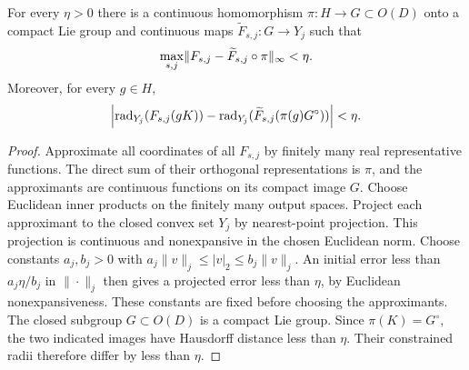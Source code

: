 \begin{lemma}\label{lem:Lieapprox55}
For every $\eta>0$ there is a continuous homomorphism $\pi:H\to G\subset O(D)$ onto a compact Lie group and continuous maps $\widetilde F_{s,j}:G\to Y_j$ such that
\[
           \max_{s,j}\lVert F_{s,j}-\widetilde F_{s,j}\circ\pi\rVert_\infty<\eta.
\]
Moreover, for every $g\in H$,
\[
 \left|\operatorname{rad}_{Y_j}(F_{s,j}(gK))-
 \operatorname{rad}_{Y_j}(\widetilde F_{s,j}(\pi(g)G^\circ))\right|<\eta.
\]
\end{lemma}
\begin{proof}
Approximate all coordinates of all $F_{s,j}$ by finitely many real representative functions. The direct sum of their orthogonal representations is $\pi$, and the approximants are continuous functions on its compact image $G$. Choose Euclidean inner products on the finitely many output spaces. Project each approximant to the closed convex set $Y_j$ by nearest-point projection. This projection is continuous and nonexpansive in the chosen Euclidean norm. Choose constants $a_j,b_j>0$ with $a_j\|v\|_j\le|v|_2\le b_j\|v\|_j$. An initial error less than $a_j\eta/b_j$ in $\|\cdot\|_j$ then gives a projected error less than $\eta$, by Euclidean nonexpansiveness. These constants are fixed before choosing the approximants. The closed subgroup $G\subset O(D)$ is a compact Lie group. Since $\pi(K)=G^\circ$, the two indicated images have Hausdorff distance less than $\eta$. Their constrained radii therefore differ by less than $\eta$.
\end{proof}

